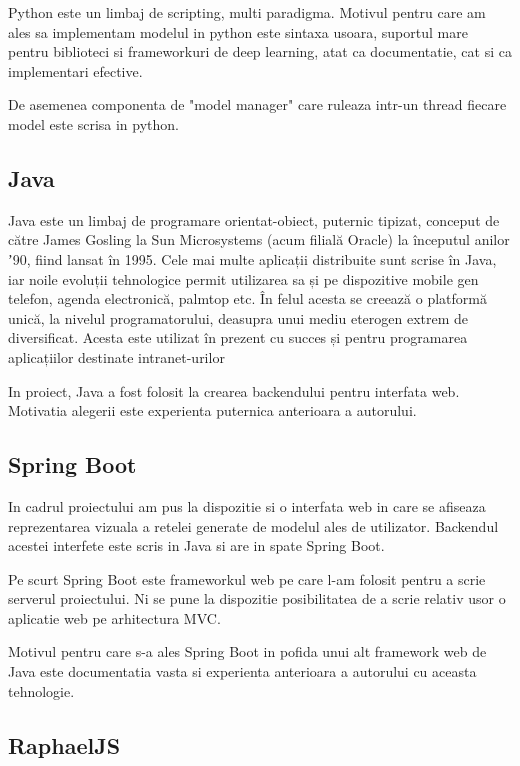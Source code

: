 \documentclass[12pt]{article}
\begin{document}
Python este un limbaj de scripting, multi paradigma. Motivul pentru care am ales sa implementam modelul in python este sintaxa usoara, suportul mare pentru biblioteci si frameworkuri de deep learning, atat ca documentatie, cat si ca implementari efective. 

De asemenea componenta de "model manager" care ruleaza intr-un thread fiecare model este scrisa in python.


\subsection{Java}

Java este un limbaj de programare orientat-obiect, puternic tipizat, conceput de către James Gosling la Sun Microsystems (acum filială Oracle) la începutul anilor ʼ90, fiind lansat în 1995. Cele mai multe aplicații distribuite sunt scrise în Java, iar noile evoluții tehnologice permit utilizarea sa și pe dispozitive mobile gen telefon, agenda electronică, palmtop etc. În felul acesta se creează o platformă unică, la nivelul programatorului, deasupra unui mediu eterogen extrem de diversificat. Acesta este utilizat în prezent cu succes și pentru programarea aplicațiilor destinate intranet-urilor

In proiect, Java a fost folosit la crearea backendului pentru interfata web. Motivatia alegerii este experienta puternica anterioara a autorului.

\subsection{Spring Boot}

In cadrul proiectului am pus la dispozitie si o interfata web in care se afiseaza reprezentarea vizuala a retelei generate de modelul ales de utilizator. Backendul acestei interfete este scris in Java si are in spate Spring Boot.

Pe scurt Spring Boot este frameworkul web pe care l-am folosit pentru a scrie serverul proiectului. Ni se pune la dispozitie posibilitatea de a scrie relativ usor o aplicatie web pe arhitectura MVC. 


Motivul pentru care s-a ales Spring Boot in pofida unui alt framework web de Java este documentatia vasta si experienta anterioara a autorului cu aceasta tehnologie.

\subsection{RaphaelJS}
\end{document}
